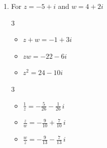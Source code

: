 \documentclass{ximera}
\begin{document}
\begin{enumerate}
\begin{multicols}{3}
\begin{itemize}
\item $\frac{z}{w} = -\frac{29}{53} - \frac{31}{53} \, i$

\item $\frac{w}{z} = -\frac{29}{34} + \frac{31}{34} \,i$

\end{itemize}

\end{multicols}

\begin{multicols}{3}

\begin{itemize}

\item $\overline{z} = 3+5i$

\item $z\overline{z} = 34$

\item $(\overline{z})^2 = -16+30i$

\end{itemize}

\end{multicols}




\item  For  $z = -5+i$ and  $w = 4+2i$

\begin{multicols}{3}

\begin{itemize}

\item $z+w = -1+3i$

\item $zw = -22-6i$

\item $z^2 = 24-10i$

\end{itemize}

\end{multicols}

\begin{multicols}{3}

\begin{itemize}

\item $\frac{1}{z} = -\frac{5}{26} - \frac{1}{26} \,i$

\item $\frac{z}{w} = -\frac{9}{10} + \frac{7}{10} \, i$

\item $\frac{w}{z} = -\frac{9}{13} - \frac{7}{13} \,i$


\end{itemize}
\end{multicols}
\end{enumerate}
\end{document}
